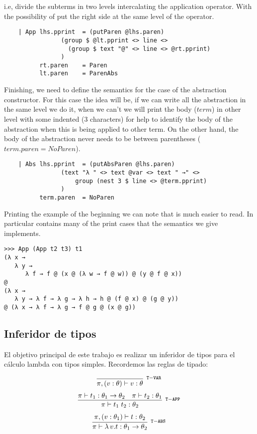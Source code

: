 \documentclass[a4paper,10pt]{article}
\newcommand{\typejud}[3] {
  \ensuremath{#1 \vdash #2 : #3}
}
\begin{document}
i.e, divide the subterms in two levels intercalating the application operator. With the
possibility of put the right side at the same level of the operator.

\begin{lstlisting}    
    | App lhs.pprint  = (putParen @lhs.paren) 
                (group $ @lt.pprint <> line <> 
                  (group $ text "@" <> line <> @rt.pprint)
                )
          rt.paren    = Paren
          lt.paren    = ParenAbs
\end{lstlisting}    

Finishing, we need to define the semantics for the case of the abstraction constructor.
For this case the idea will be, if we can write all the abstraction in the same level
we do it, when we can't we will print the body ($term$) in other level with some
indented (3 characters) for help to identify the body of the abstraction when this
is being applied to other term. On the other hand, the body of the abstraction never
needs to be between parentheses ($term.paren = NoParen$).

\begin{lstlisting}
    | Abs lhs.pprint  = (putAbsParen @lhs.paren)
                (text "λ " <> text @var <> text " →" <> 
                    group (nest 3 $ line <> @term.pprint)
                )
          term.paren  = NoParen
\end{lstlisting}

Printing the example of the beginning we can note that is much easier to read. In
particular contains many of the print cases that the semantics we give implements.

\begin{verbatim}
>>> App (App t2 t3) t1
(λ x →
   λ y →
      λ f → f @ (x @ (λ w → f @ w)) @ (y @ f @ x))
@
(λ x →
   λ y → λ f → λ g → λ h → h @ (f @ x) @ (g @ y))
@ (λ x → λ f → λ g → f @ g @ (x @ g))
\end{verbatim}

\subsection{Inferidor de tipos}
 El objetivo principal de este trabajo es realizar un inferidor de tipos para el cálculo lambda con tipos simples. Recordemos
 las reglas de tipado:
 
 \begin{align*}
 \infer[^{\mathtt{T-VAR}}]
       {\typejud{\pi,(v:\theta)}{v}{\theta}}
       {}
 \end{align*}
  \begin{align*}
  \infer[^{\mathtt{T-APP}}]
       {\typejud{\pi}{t_1\;t_2}{\theta_2}}
       {\typejud{\pi}{t_1}{\theta_1\rightarrow\theta_2} &
        \typejud{\pi}{t_2}{\theta_1}
       }
  \end{align*}
  \begin{align*}
  \infer[^{\mathtt{T-ABS}}]
       {\typejud{\pi}{\lambda\,v.t}{\theta_1 \rightarrow \theta_2}}
       {\typejud{\pi,(v:\theta_1)}{t}{\theta_2}
       }
  \end{align*}
 
\end{document}
